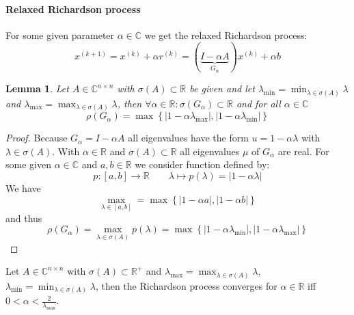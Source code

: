 \documentclass[a4paper]{article}
\newcounter{lecref}[section]
\numberwithin{lecref}{section}
\theoremstyle{break}
\newtheorem{lemma}[lecref]{Lemma}
\newcommand{\Abs}[1]{\left|#1\right|}
\newcommand{\Set}[1]{\left\{#1\right\}}
\begin{document}
\paragraph{Relaxed Richardson process}

For some given parameter $\alpha \in \mathbb C$ we get the relaxed Richardson process:
\[ x^{(k+1)} = x^{(k)} + \alpha r^{(k)} = (\underbrace{I - \alpha A}_{G_\alpha}) x^{(k)} + \alpha b \]

\begin{lemma}
  \label{lemma:7-3}
  Let $A \in \mathbb C^{n \times n}$ with $\sigma(A) \subset \mathbb R$ be given
  and let $\lambda_{\min} = \min_{\lambda \in \sigma(A)} \lambda$ and $\lambda_{\max} = \max_{\lambda \in \sigma(A)} \lambda$,
  then $\forall \alpha \in \mathbb R: \sigma(G_\alpha) \subset \mathbb R$ and for all $\alpha \in \mathbb C$
  \[ \rho(G_\alpha) = \max\Set{\Abs{1 - \alpha \lambda_{\max}}, \Abs{1 - \alpha \lambda_{\min}}} \]
\end{lemma}

\begin{proof}
  Because $G_\alpha = I - \alpha A$ all eigenvalues have the form $u = 1 - \alpha \lambda$ with $\lambda \in \sigma(A)$.
  With $\alpha \in \mathbb R$ and $\sigma(A) \subset \mathbb R$ all eigenvalues $\mu$ of $G_\alpha$ are real.
  For some given $\alpha \in \mathbb C$ and $a, b \in \mathbb R$ we consider function defined by:
  \[ p: [a, b] \to \mathbb R \qquad \lambda \mapsto p(\lambda) = \Abs{1 - \alpha \lambda} \]
  We have
  \[ \max_{\lambda \in [a, b]} = \max\Set{\Abs{1 - \alpha a}, \Abs{1 - \alpha b}} \]
  and thus
  \[ \rho(G_\alpha) = \max_{\lambda \in \sigma(A)} p(\lambda) = \max\Set{\Abs{1 - \alpha \lambda_{\min}}, \Abs{1 - \alpha \lambda_{\max}}} \]
\end{proof}

\begin{theorem}
  \label{theorem:7-4}
  Let $A \in \mathbb C^{n \times n}$ with $\sigma(A) \subset \mathbb R^+$ and $\lambda_{\max} = \max_{\lambda \in \sigma(A)} \lambda$,
  $\lambda_{\min} = \min_{\lambda \in \sigma(A)} \lambda$, then the Richardson process converges for $\alpha \in \mathbb R$ iff $0 < \alpha < \frac{2}{\lambda_{\max}}$.
\end{theorem}
\end{document}
